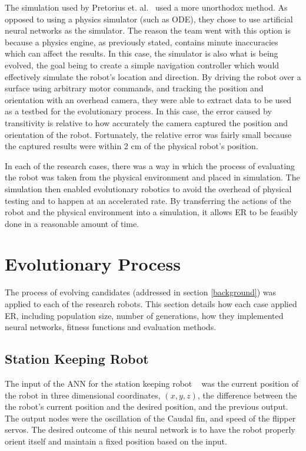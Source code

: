 \documentclass{sig-alternate}
\begin{document}
 
 The simulation used by Pretorius et. al.~\cite{Pretorius:2009:TAN:1632149.1632171} used a more unorthodox method. As opposed to using a physics simulator (such as ODE), they chose to use artificial neural networks as the simulator. The reason the team went with this option is because a physics engine, as previously stated, contains minute inaccuracies which can affect the results. In this case, the simulator is also what is being evolved, the goal being to create a simple navigation controller which would effectively simulate the robot's location and direction. By driving the robot over a surface using arbitrary motor commands, and tracking the position and orientation with an overhead camera, they were able to extract data to be used as a testbed for the evolutionary process. In this case, the error caused by transitivity is relative to how accurately the camera captured the position and orientation of the robot. Fortunately, the relative error was fairly small because the captured results were within 2 cm of the physical robot's position. 
 
 In each of the research cases, there was a way in which the process of evaluating the robot was taken from the physical environment and placed in simulation. The simulation then enabled evolutionary robotics to avoid the overhead of physical testing and to happen at an accelerated rate. By transferring the actions of the robot and the physical environment into a simulation, it allows ER to be feasibly done in a reasonable amount of time.

\section{ Evolutionary Process}\label{evolution}
  The process of evolving candidates (addressed in section \ref{background}) was applied to each of the research robots. This section details how each case applied ER, including population size, number of generations, how they implemented neural networks, fitness functions and evaluation methods.
  \subsection{Station Keeping Robot}\label{Moore Evolving}
  The input of the ANN for the station keeping robot ~\cite{Moore:2013:ESK:2463372.2463402} was the current position of the robot in three dimensional coordinates, $(x,y,z)$, the difference between the the robot's current position and the desired position, and the previous output. The output nodes were the oscillation of the Caudal fin, and speed of the flipper servos. The desired outcome of this neural network is to have the robot properly orient itself and maintain a fixed position based on the input.
  
\end{document}
